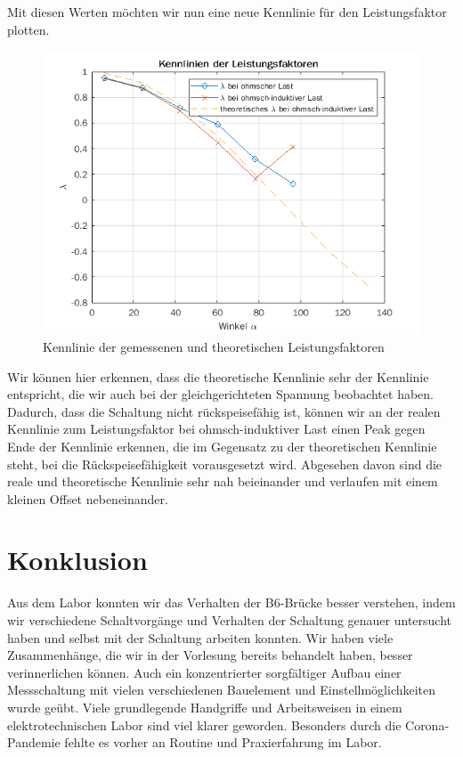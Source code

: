 \documentclass{article}
\begin{document}
\pagebreak[4]

Mit diesen Werten möchten wir nun eine neue Kennlinie für den Leistungsfaktor plotten.


\begin{figure}[!h]
  \centering
  \includegraphics[width=.75\textwidth]{../assets/images/GEP2/lambda_alpha.png}
  \caption{Kennlinie der gemessenen und theoretischen Leistungsfaktoren}
  \label{fig:lambda}
\end{figure}

\newpage
Wir können hier erkennen, dass die theoretische Kennlinie sehr der Kennlinie entspricht, die wir auch bei der gleichgerichteten Spannung beobachtet haben. Dadurch, dass die Schaltung nicht rückspeisefähig ist, können wir an der realen Kennlinie zum Leistungsfaktor bei ohmsch-induktiver Last einen Peak gegen Ende der Kennlinie erkennen, die im Gegensatz zu der theoretischen Kennlinie steht, bei die Rückspeisefähigkeit vorausgesetzt wird. Abgesehen davon sind die reale und theoretische Kennlinie sehr nah beieinander und verlaufen mit einem kleinen Offset nebeneinander.


\section{Konklusion}
\label{sec:konklusion}

Aus dem Labor konnten wir das Verhalten der B6-Brücke besser verstehen, indem wir verschiedene Schaltvorgänge und Verhalten der Schaltung genauer untersucht haben und selbst mit der Schaltung arbeiten konnten. Wir haben viele Zusammenhänge, die wir in der Vorlesung bereits behandelt haben, besser verinnerlichen können. Auch ein konzentrierter sorgfältiger Aufbau einer Messschaltung mit vielen verschiedenen Bauelement und Einstellmöglichkeiten wurde geübt. Viele grundlegende Handgriffe und Arbeitsweisen in einem elektrotechnischen Labor sind viel klarer geworden. Besonders durch die Corona-Pandemie fehlte es vorher an Routine und Praxierfahrung im Labor.
\end{document}
